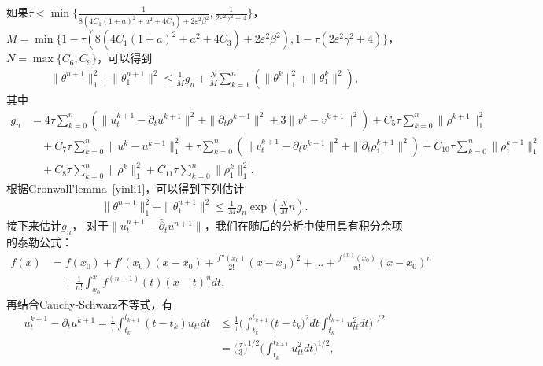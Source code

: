 \documentclass[twoside,UTF8]{nputhesis}
\begin{document}
如果$\tau<\min\{\frac{1}{8(4C_1(1+a)^2+a^2+4C_3)+2\varepsilon^2\beta^2},\frac{1}{2\varepsilon^2\gamma^2+4}\}$，$M=\min\{1-\tau(8(4C_1(1+a)^2+a^2+4C_3)+2\varepsilon^2\beta^2),1-\tau(2\varepsilon^2\gamma^2+4)\}$，$N=\max\{C_6,C_9\}$，可以得到
\begin{equation*}
\begin{split}
\| \theta^{n+1}\|^2_1+\| \theta^{n+1}_1\|^2\leq \frac{1}{M}g_n+\frac{N}{M}\sum^n_{k=1}(\| \theta^k\|^2_1+\| \theta_1^k\|^2),
\label{48}
\end{split}
\end{equation*}
其中
\begin{equation*}
\begin{split}
g_n&=4\tau\sum_{k=0}^{n}(\| u^{k+1}_t-\bar{\partial_t}u^{k+1}\|^2+\| \bar{\partial_t}\rho^{k+1}\|^2+3\|v^k-v^{k+1}\|^2)+C_5\tau\sum_{k=0}^{n}\|\rho^{k+1}\|_1^2\\
&\quad +C_7\tau\sum_{k=0}^{n}\|u^k-u^{k+1}\|_1^2+\tau\sum_{k=0}^{n}(\| v_t^{k+1}-\bar{\partial_t}v^{k+1}\|^2+\| \bar{\partial_t}\rho^{k+1}_1\|^2)+C_{10}\tau\sum_{k=0}^{n}\| \rho^{k+1}_1\|^2_1\\
&\quad +C_8\tau\sum^n_{k=0}\|\rho^k\|_1^2+C_{11}\tau\sum^n_{k=0}\|\rho^k_1\|^2_1.
\label{49}
\end{split}
\end{equation*}
根据Gronwall'lemma~\ref{yinli1}，可以得到下列估计
\begin{equation}
\begin{split}
\| \theta^{n+1}\|^2_1+\| \theta^{n+1}_1\|^2\leq \frac{1}{M}g_n\exp\left(\frac{N}{M}n\right).
\label{50}
\end{split}
\end{equation}
接下来估计$g_n$，
对于$\| u^{n+1}_t-\bar{\partial}_tu^{n+1}\|$，我们在随后的分析中使用具有积分余项的泰勒公式：
\begin{equation*}
\begin{split}
f(x)&=f(x_0)+f'(x_0)(x-x_0)+\frac{f''(x_0)}{2!}(x-x_0)^2+...+\frac{f^{(n)}(x_0)}{n!}(x-x_0)^n\\
&\quad+\frac{1}{n!}\int^x_{x_0}f^{(n+1)}(t)(x-t)^ndt,
\end{split}
\end{equation*}
再结合Cauchy-Schwarz不等式，有
\begin{equation*}
\begin{split}
u^{k+1}_t-\bar{\partial}_tu^{k+1}=\frac{1}{\tau}\int^{t_{k+1}}_{t_k}(t-t_k)u_{tt}dt&\leq\frac{1}{\tau}\Big(\int^{t_{k+1}}_{t_k}\big(t-t_k\big)^2dt\int^{t_{k+1}}_{t_k}u^2_{tt}dt\Big)^{1/2}\\
&=\Big(\frac{\tau}{3}\Big)^{1/2}\Big(\int^{t_{k+1}}_{t_k}u^2_{tt}dt\Big)^{1/2},
\label{51}
\end{split}
\end{equation*}
\end{document}
